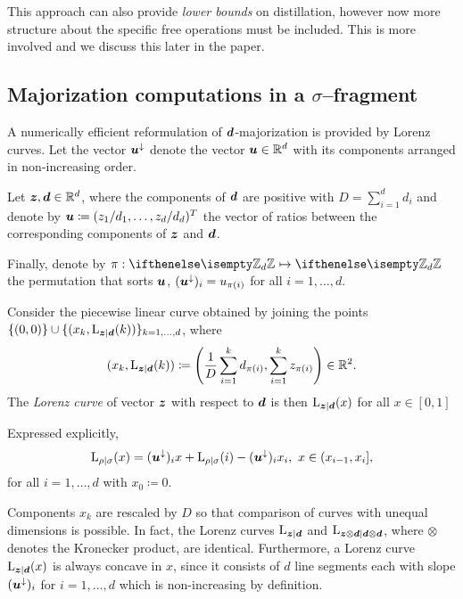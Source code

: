 \documentclass[pra,
aps,
twocolumn,
superscriptaddress,
groupedaddress,
nofootinbib,
reprint
]{revtex4-1}
\begin{document}
This approach can also provide \emph{lower bounds} on distillation, however now more structure about the specific free operations must be included. This is more involved and we discuss this later in the paper.

\subsection{Majorization computations in a $\sigma$--fragment}
A numerically efficient reformulation of $\bm{d}$-majorization is provided by Lorenz curves.
Let the vector $\bm{u}^\downarrow$ denote the vector $\bm{u} \in \mathbb{R}^d$ with its components arranged in non-increasing order.
\begin{definition}\label{def:lc}
    Let $\bm{z}, \bm{d} \in \mathbb{R}^d$, where the components of $\bm{d}$ are positive with $D = \sum_{i=1}^d d_i$ and denote by $\bm{u} \coloneqq (z_1/d_1, \dots, z_d/d_d)^T$ the vector of ratios between the corresponding components of $\bm{z}$ and $\bm{d}$.
    
    Finally, denote by $\pi: \zd \mapsto \zd$ the permutation that sorts $\bm{u}$, $(\bm{u}^\downarrow)_i = u_{\pi(i)}$ for all $i=1,\dots,d$.
    
    Consider the piecewise linear curve obtained by joining the points $\{(0,0)\} \cup \{ (x_k, {{\rm{L}}_{\bm{z}|\bm{d}}}(k)) \}_{k=1,\dots,d}$, where
    \begin{equation}\label{eq:lorenz}
        (x_k, {{\rm{L}}_{\bm{z}|\bm{d}}}(k)) \coloneqq \left( \frac{1}{D}\sum_{i=1}^k d_{\pi(i)}, \sum_{i=1}^k z_{\pi(i)} \right) \in \mathbb{R}^2.
    \end{equation}
    The \emph{Lorenz curve} of vector $\bm{z}$ with respect to $\bm{d}$ is then ${{\rm{L}}_{\bm{z}|\bm{d}}}(x)$ for all $x \in [0,1]$
    
    Expressed explicitly,
    \begin{equation}
		{{\rm{L}}_{\rho|\sigma}}(x) = (\bm{u}^\downarrow)_i x + {{\rm{L}}_{\rho|\sigma}}(i) - (\bm{u}^\downarrow)_i x_i,\ x \in (x_{i-1}, x_i],
	\end{equation}
	for all $i=1,\dots,d$ with $x_0 \coloneqq 0$.
\end{definition}
 
Components $x_k$ are rescaled by $D$ so that comparison of curves with unequal dimensions is possible.
In fact, the Lorenz curves ${{\rm{L}}_{\bm{z}|\bm{d}}}$ and ${{\rm{L}}_{\bm{z} \otimes \bm{d}|\bm{d} \otimes \bm{d}}}$, where $\otimes$ denotes the Kronecker product, are identical.
Furthermore, a Lorenz curve ${{\rm{L}}_{\bm{z}|\bm{d}}}(x)$ is always concave in $x$, since it consists of $d$ line segments each with slope $(\bm{u}^\downarrow)_i$ for $i=1,\dots,d$ which is non-increasing by definition.
\end{document}
